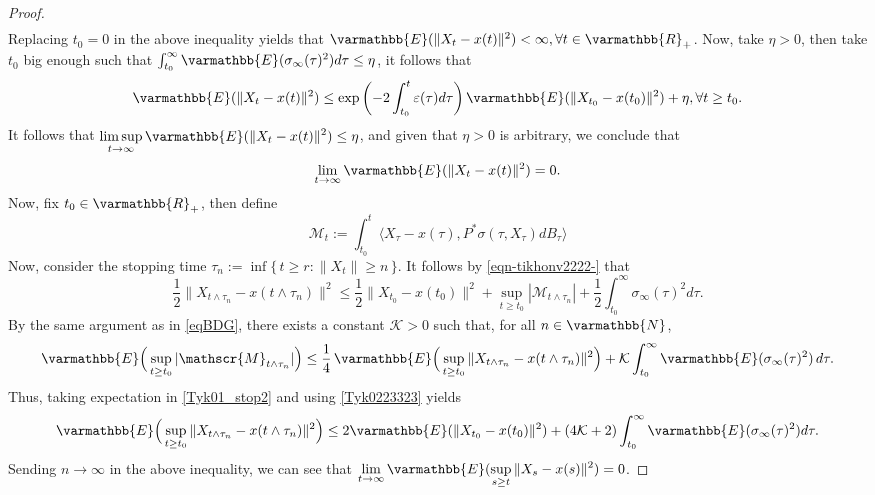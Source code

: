 \documentclass[11pt,reqno]{article}
\let\mathbb=\varmathbb
\newcommand{\R}{\mathbb{R}}
\newcommand{\N}{\mathbb{N}}
\renewcommand{\epsilon}{\varepsilon}
\newcommand{\1}{\mathds{1}}
\numberwithin{equation}{section}  %
\theoremstyle{plain}
\theoremstyle{definition}
\theoremstyle{remark}
\numberwithin{theorem}{section}
\numberwithin{remark}{section}
\numberwithin{example}{section}
\begin{document}
\begin{proof}
\begin{equation*}
\begin{aligned}
        \end{aligned}
    \end{equation*}
    Replacing $t_0 = 0$ in the above inequality yields that $\mathbb{E}(\|X_t-x(t)\|^2)<\infty, \forall t\in \R_+$. Now, take $\eta>0$, then take $t_0$ big enough such that $\int_{t_0}^\infty\mathbb{E}(\sigma_\infty(\tau)^2)d\tau\leq \eta$, it follows that \begin{equation*}
        \mathbb{E}(\|X_t-x(t)\|^2)\leq \exp\left(-2\int_{t_0}^t\epsilon(\tau)d\tau\right)\mathbb{E}(\|X_{t_0}-x(t_0)\|^2) + \eta, \forall t\geq t_0.
    \end{equation*}
    It follows that $\displaystyle\limsup_{t\to \infty}\mathbb{E}(\|X_t-x(t)\|^2)\leq\eta$, and given that $\eta>0$ is arbitrary, we conclude that $$\displaystyle\lim_{t\to \infty}\mathbb{E}(\|X_t-x(t)\|^2)=0.$$
    Now, fix $t_0\in \R_+$, then define 
    \begin{equation*}
        \mathscr{M}_t:=\int_{t_0}^t\langle X_\tau-x(\tau),P^\ast \sigma(\tau,X_\tau)dB_\tau\rangle    
    \end{equation*} 
    Now, consider the stopping time $\tau_n := \inf\{\,t\geq r : \|X_t\|\geq n \,\}$.  It follows by \eqref{eqn-tikhonv2222-} that 
	\begin{equation}\label{Tyk01_stop2}
			\frac{1}{2}\|X_{t\wedge \tau_n}-x(t\wedge \tau_n)\|^2
			\leq \frac{1}{2}\|X_{t_0}-x(t_0)\|^2 + \sup_{t\geq t_0}|\mathscr{M}_{t\wedge\tau_n}|+ \frac{1}{2}\int_{t_0}^\infty\sigma_\infty(\tau)^2d\tau.
		\end{equation}
	By the same argument as in \eqref{eqBDG}, there exists a constant $\mathcal{K}>0$ such that, for all $n\in\N$,
	\begin{equation}\label{Tyk0223323}
		\mathbb{E}\Big(\sup_{t \geq t_0} |\mathscr{M}_{t\wedge\tau_n}|\Big) 
		\leq \frac{1}{4}\,\mathbb{E}\Big(\sup_{t\geq t_0}\|X_{t\wedge\tau_n}-x(t\wedge\tau_n)\|^2\Big) 
		+  \mathcal{K} \int_{t_0}^\infty \mathbb{E}(\sigma_\infty(\tau)^2) \, d\tau.
	\end{equation}
    Thus, taking expectation in \eqref{Tyk01_stop2} and using \eqref{Tyk0223323} yields
    \begin{equation*}           \mathbb{E}\Big(\sup_{t\geq t_0}\|X_{t\wedge\tau_n}-x(t\wedge\tau_n)\|^2\Big)\leq 2\mathbb{E}(\|X_{t_0}-x(t_0)\|^2) + (4\mathcal{K}+2)\int_{t_0}^\infty\mathbb{E}(\sigma_\infty(\tau)^2)d\tau.
    \end{equation*}
    Sending $n\to \infty$ in the above inequality, we can see that $\displaystyle \lim_{t\to \infty}\mathbb{E}(\sup_{s\geq t}\|X_s-x(s)\|^2) = 0$.
\end{proof}
\end{document}
